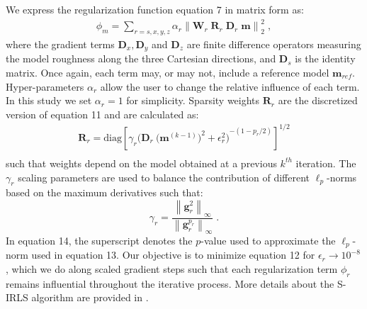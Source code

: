 \documentclass[paper]{geophysics}
\begin{document}
We express the regularization function equation 7 in matrix form as:
\begin{equation} \label{phi_m_sparse}
\begin{split}
\phi_m = \sum_{r = s,x,y,z} \alpha_r {\|\mathbf{W}_{r} \;\mathbf{R}_r \; \mathbf{D}_r \; \mathbf{m}\|}^2_2 \;,
\end{split}
\end{equation}
where the gradient terms $\mathbf{D}_x, \mathbf{D}_y$ and $\mathbf{D}_z$ are finite difference operators measuring the model roughness along the three Cartesian directions, and $\mathbf{D}_s$ is the identity matrix. Once again, each term may, or may not, include a reference model $\mathbf{m}_{ref}$. Hyper-parameters $\alpha_r$ allow the user to change the relative influence of each term. In this study we set $\alpha_r=1$ for simplicity.
Sparsity weights $\mathbf{R}_r$ are the discretized version of equation 11 and are calculated as:
\begin{equation}\label{eq:Rx_w}
\begin{split}
	\mathbf{R}_r = \text{diag} \left[ \gamma_r {\Big( {{\mathbf{D}_r\:(\mathbf{m}^{(k-1)}}})^{2} + \epsilon_r^2 \Big)}^{- (1 - p_r/2)} \right]^{1/2} \\
\end{split}
\end{equation}
such that weights depend on the model obtained at a previous $k^{th}$ iteration. The $\gamma_r$ scaling parameters are used to balance the contribution of different $\ell_p$-norms based on the maximum derivatives such that:
\begin{equation}\label{gammaScale}
\gamma_r = \frac{ \left\| \mathbf{g}_r^2 \right\|_\infty}{\left\|\mathbf{g}_r^{p_r}\right\|_\infty}\;.
\end{equation}
In equation 14, the superscript denotes the $p$-value used to approximate the $\ell_p$-norm used in equation 13. Our objective is to minimize equation 12 for $\epsilon_r \rightarrow 10^{-8}$, which we do along scaled gradient steps such that each regularization term $\phi_r$ remains influential throughout the iterative process.
More details about the S-IRLS algorithm are provided in \cite{FournierDWO2019}.
\end{document}
